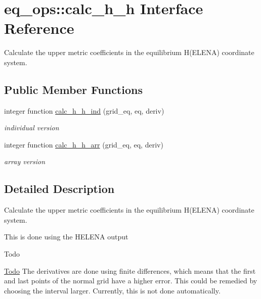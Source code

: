 \hypertarget{interfaceeq__ops_1_1calc__h__h}{}\section{eq\+\_\+ops\+:\+:calc\+\_\+h\+\_\+h Interface Reference}
\label{interfaceeq__ops_1_1calc__h__h}


Calculate the upper metric coefficients in the equilibrium H(\+E\+L\+E\+N\+A) coordinate system.  


\subsection*{Public Member Functions}
\begin{DoxyCompactItemize}
\item 
integer function \hyperlink{interfaceeq__ops_1_1calc__h__h_ab072d5b8098cccac9afecf36d04a4229}{calc\+\_\+h\+\_\+h\+\_\+ind} (grid\+\_\+eq, eq, deriv)
\begin{DoxyCompactList}\small\item\em individual version \end{DoxyCompactList}\item 
integer function \hyperlink{interfaceeq__ops_1_1calc__h__h_a89d924d685ffdee10ac7ede93d749b23}{calc\+\_\+h\+\_\+h\+\_\+arr} (grid\+\_\+eq, eq, deriv)
\begin{DoxyCompactList}\small\item\em array version \end{DoxyCompactList}\end{DoxyCompactItemize}


\subsection{Detailed Description}
Calculate the upper metric coefficients in the equilibrium H(\+E\+L\+E\+N\+A) coordinate system. 

This is done using the H\+E\+L\+E\+NA output

\begin{DoxyRefDesc}{Todo}
\item[\hyperlink{todo__todo000001}{Todo}]The derivatives are done using finite differences, which means that the first and last points of the normal grid have a higher error. This could be remedied by choosing the interval larger. Currently, this is not done automatically.\end{DoxyRefDesc}


